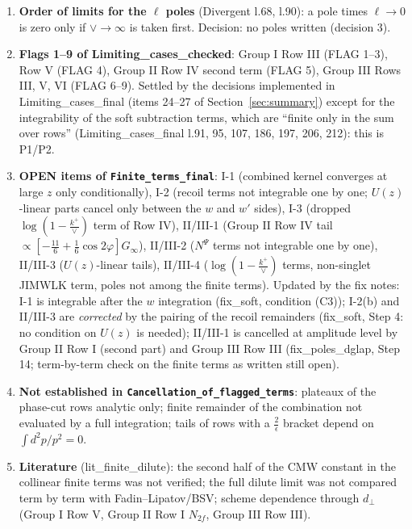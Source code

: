 \documentclass[10pt]{article}
\begin{document}
\begin{enumerate}
\item \textbf{Order of limits for the $\ell$ poles} (Divergent l.68, l.90): a pole times $\ell\to0$ is zero only if $\vee\to\infty$ is taken first. Decision: no poles written (decision 3).
\item \textbf{Flags 1--9 of Limiting\_cases\_checked}: Group I Row III (FLAG 1--3), Row V (FLAG 4), Group II Row IV second term (FLAG 5), Group III Rows III, V, VI (FLAG 6--9). Settled by the decisions implemented in Limiting\_cases\_final (items 24--27 of Section~\ref{sec:summary}) except for the integrability of the soft subtraction terms, which are ``finite only in the sum over rows'' (Limiting\_cases\_final l.91, 95, 107, 186, 197, 206, 212): this is P1/P2.
\item \textbf{OPEN items of \texttt{Finite\_terms\_final}}: I-1 (combined kernel converges at large $z$ only conditionally), I-2 (recoil terms not integrable one by one; $U(z)$-linear parts cancel only between the $w$ and $w'$ sides), I-3 (dropped $\log(1-\frac{k^{+}}{\vee})$ term of Row IV), II/III-1 (Group II Row IV tail $\propto[-\frac{11}{6}+\frac16\cos2\varphi]G_{\infty}$), II/III-2 ($N^{\Psi}$ terms not integrable one by one), II/III-3 ($U(z)$-linear tails), II/III-4 ($\log(1-\frac{k^{+}}{\vee})$ terms, non-singlet JIMWLK term, poles not among the finite terms). Updated by the fix notes: I-1 is integrable after the $w$ integration (fix\_soft, condition (C3)); I-2(b) and II/III-3 are \emph{corrected} by the pairing of the recoil remainders (fix\_soft, Step 4: no condition on $U(z)$ is needed); II/III-1 is cancelled at amplitude level by Group II Row I (second part) and Group III Row III (fix\_poles\_dglap, Step 14; term-by-term check on the finite terms as written still open).
\item \textbf{Not established in \texttt{Cancellation\_of\_flagged\_terms}}: plateaux of the phase-cut rows analytic only; finite remainder of the combination not evaluated by a full integration; tails of rows with a $\frac{2}{\epsilon}$ bracket depend on $\int d^{2}p/p^{2}=0$.
\item \textbf{Literature} (lit\_finite\_dilute): the second half of the CMW constant in the collinear finite terms was not verified; the full dilute limit was not compared term by term with Fadin--Lipatov/BSV; scheme dependence through $d_{\perp}$ (Group I Row V, Group II Row I $N_{2f}$, Group III Row III).
\end{enumerate}
\end{document}
